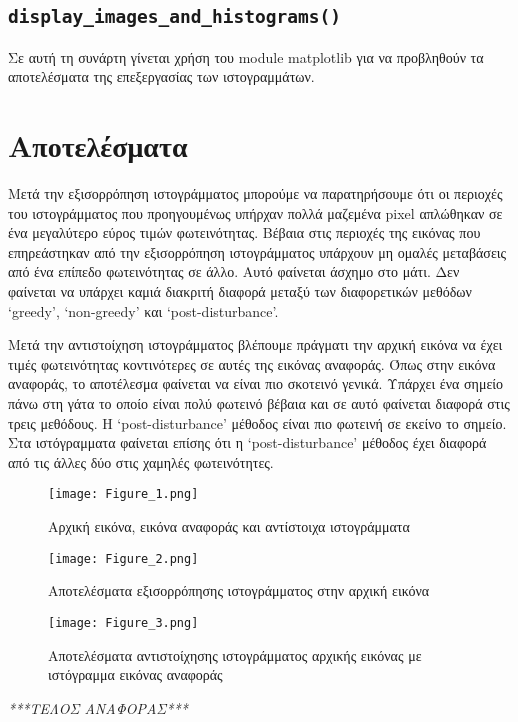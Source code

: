 \documentclass{article}
\begin{document}
\subsection{\texttt{display\_images\_and\_histograms()}}\label{helpfunc-display}

Σε αυτή τη συνάρτη γίνεται χρήση του module matplotlib για να 
προβληθούν τα αποτελέσματα της επεξεργασίας των ιστογραμμάτων. 

\section{Αποτελέσματα}
Μετά την εξισορρόπηση ιστογράμματος μπορούμε να παρατηρήσουμε ότι οι περιοχές 
του ιστογράμματος που προηγουμένως υπήρχαν πολλά μαζεμένα pixel απλώθηκαν σε ένα 
μεγαλύτερο εύρος τιμών φωτεινότητας. Βέβαια στις περιοχές της εικόνας που επηρεάστηκαν από
την εξισορρόπηση ιστογράμματος υπάρχουν μη ομαλές μεταβά\-σεις από ένα επίπεδο
φωτεινότητας σε άλλο. Αυτό φαίνεται άσχημο στο μάτι. Δεν φαίνεται να υπάρχει 
καμιά διακριτή διαφορά μεταξύ των διαφορετικών μεθόδων `greedy', `non-greedy' και
`post-disturbance'.

Μετά την αντιστοίχηση ιστογράμματος βλέπουμε πράγματι την αρχική εικόνα να 
έχει τιμές φωτεινότητας κοντινότερες σε αυτές της εικόνας αναφοράς. Όπως στην εικόνα
αναφοράς, το αποτέλεσμα φαίνεται να είναι πιο σκοτεινό γενικά. Υπάρχει ένα 
σημείο πάνω στη γάτα το οποίο είναι πολύ φωτεινό βέβαια και σε αυτό φαίνεται διαφορά 
στις τρεις μεθόδους. Η `post-disturbance' μέθοδος είναι πιο φωτεινή σε
εκείνο το σημείο. Στα ιστόγραμματα φαίνεται επίσης ότι η `post-disturbance'
μέθοδος έχει διαφορά από τις άλλες δύο στις χαμηλές φωτεινότητες.

\begin{figure}
    \centering
    \texttt{[image: Figure\_1.png]}
    \caption{Αρχική εικόνα, εικόνα αναφοράς και αντίστοιχα ιστογράμματα}
\end{figure}

\begin{figure}
    \centering
    \texttt{[image: Figure\_2.png]}
    \caption{Αποτελέσματα εξισορρόπησης ιστογράμματος στην αρχική εικόνα}
\end{figure}

\begin{figure}
    \centering
    \texttt{[image: Figure\_3.png]}
    \caption{Αποτελέσματα αντιστοίχησης ιστογράμματος αρχικής εικόνας με ιστόγραμμα
        εικόνας αναφοράς}
\end{figure}

\newpage

\vspace{2em}
\centering
\emph{***ΤΕΛΟΣ ΑΝΑΦΟΡΑΣ***}
\end{document}

